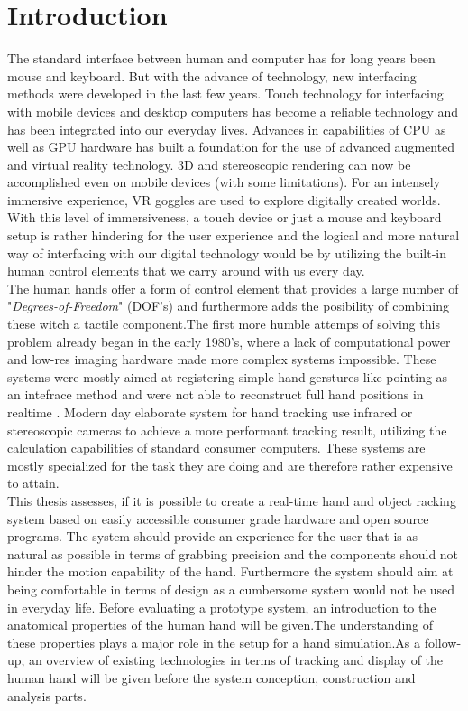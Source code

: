 \chapter{Introduction}
The standard interface between human and computer has for long years been mouse and keyboard. But with the advance of technology, new interfacing methods were developed in the last few years.
Touch technology for interfacing with mobile devices and desktop computers has become a reliable technology and has been integrated into our everyday lives.
Advances in capabilities of CPU as well as GPU hardware has built a foundation for the use of advanced augmented and virtual reality technology. 3D and stereoscopic rendering can now be accomplished even on mobile devices (with some limitations). For an intensely immersive experience, VR goggles are used to explore digitally created worlds.\\
With this level of immersiveness, a touch device or just a mouse and keyboard setup is rather hindering for the user experience and the logical and more natural way of interfacing with our digital technology would be by utilizing the built-in human control elements that we carry around with us every day.\\ The human hands offer a form of control element that provides a large number of "\textit{Degrees-of-Freedom}" (DOF's) and furthermore adds the posibility of combining these witch a tactile component.The first more humble attemps of solving this problem already began in the early 1980's, where a lack of computational power and low-res imaging hardware made more complex systems impossible. These systems were mostly aimed at registering simple hand gerstures like pointing as an intefrace method and were not able to reconstruct full hand positions in realtime \cite{Bolt.1980}. Modern day elaborate system for hand tracking use infrared or stereoscopic cameras to achieve a  more performant tracking result, utilizing the calculation capabilities of standard consumer computers. These systems are mostly specialized for the task they are doing and are therefore rather expensive to attain. \\
This thesis assesses, if it is possible to create a real-time hand and object racking system based on easily accessible consumer grade hardware and open source programs. The system should provide an experience for the user that is as natural as possible in terms of grabbing precision and the components should not hinder the motion capability of the hand. Furthermore the system should aim at being comfortable in terms of design as a cumbersome system would not be used  in everyday life.
Before evaluating a prototype system, an introduction to the anatomical properties of the human hand will be given.The understanding of these properties plays a major role in the setup for a hand simulation.As a follow-up, an overview of existing technologies in terms of tracking and display of the human hand will be given before the system conception, construction and analysis parts.

